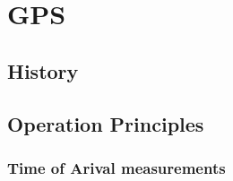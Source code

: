 \chapter{GPS}
\label{chap:gps}

%
%
%
%
\section{History}
%
\section{Operation Principles}
%
\subsection{Time of Arival measurements}

%
%
%
%
%
